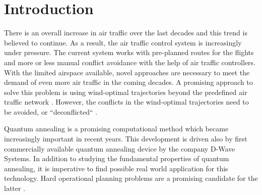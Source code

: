 \section{Introduction}
There is an overall increase in air traffic over the last decades and this trend is believed to continue.
As a result, the air traffic control system is increasingly under pressure.
The current system works with pre-planned routes for the flights and more or less manual conflict avoidance with the help of air traffic controllers.
With the limited airspace available, novel approaches are necessary to meet the demand of even more air traffic in the coming decades.
A promising approach to solve this problem is using wind-optimal trajectories beyond the predefined air traffic network \cite{ng_optimizing_2014}.
However, the conflicts in the wind-optimal trajectories need to be avoided, or ``deconflicted``  \cite{rodionova16}.

Quantum annealing is a promising computational method which became increasingly important in recent years.
This development is driven also by first commercially available quantum annealing device by the company D-Wave Systems.
In addition to studying the fundamental properties of quantum annealing, it is imperative to find possible real world application for this technology.
Hard operational planning problems are a promising candidate for the latter \cite{Rieffel2015, AAAI148614, Venturelli2015}.

